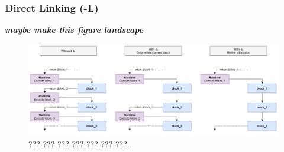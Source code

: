 \subsubsection{Direct Linking (-L)}

\textbf{\textit{maybe make this figure landscape}}

\begin{figure}[h]
    \centering
    \includegraphics[width=1\linewidth]{diagrams/relinking.png}
    \caption{??? ??? ??? ??? ??? ??? ???.}
    \label{figure:relinking}
\end{figure}